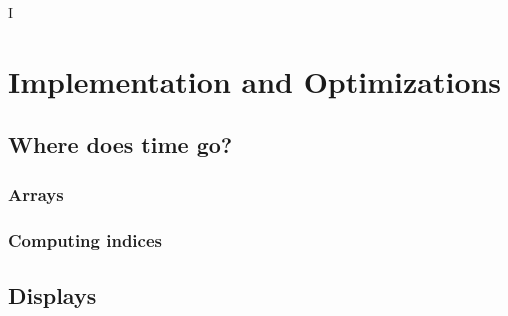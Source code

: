 I%

\chapter{Implementation and Optimizations} %

\label{Implementation} %



\section{Where does time go?}



\subsection{Arrays}



\subsection{Computing indices}





\section{Displays}


